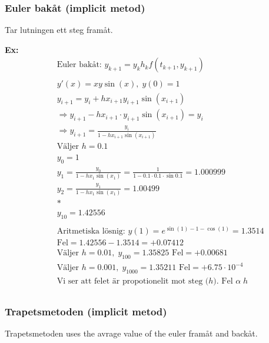 \newpage
\subsubsection{Euler bakåt (implicit metod)}
Tar lutningen ett steg framåt.

\textbf{Ex:}
\begin{align*}
  &\quad  \text{Euler bakåt: } y_{k+1} = y_k h_kf(t_{k+1},y_{k+1}) \\
  &\quad  \\
  &\quad  y'(x) = xy\sin{(x)}, \; y(0)=1 \\
  &\quad  y_{i+1} = y_i + hx_{i+1}y_{i+1}\sin{(x_{i+1})} \\
  &\quad  \Rightarrow y_{i+1} -hx_{i+1}\cdot{y_{i+1}}\sin{(x_{i+1})} = y_i \\
  &\quad  \Rightarrow y_{i+1} = \frac{y_i}{1 -hx_{i+1}\sin{(x_{i+1})}} \\
  &\quad  \text{Väljer $h=0.1$} \\
  &\quad  y_0 = 1 \\
  &\quad  y_1 = \frac{y_0}{1 -hx_{1}\sin{(x_{1})}} = \frac{1}{1 -0.1\cdot0.1\cdot\sin{0.1}}
        = 1.000999 \\
  &\quad  y_2 = \frac{y_1}{1 -hx_{1}\sin{(x_{1})}} = 1.00499 \\
  &\quad  * \\
  &\quad  y_{10} = 1.42556 \\
  &\quad  \\
  &\quad  \text{Aritmetiska lösnig: } y(1)=e^{\sin{(1)-1-\cos{(1)}}} = 1.3514 \\
  &\quad  \text{Fel} = 1.42556-1.3514 = +0.07412 \\
  &\quad  \text{Väljer } h=0.01, \; y_{100} = 1.35825 \text{ Fel} = +0.00681 \\
  &\quad  \text{Väljer } h=0.001, \; y_{1000} = 1.35211 \text{ Fel} = +6.75\cdot10^{-4} \\
  &\quad  \text{Vi ser att felet är propotionelit mot steg ($h$). Fel } \alpha \; h \\
\end{align*}

\newpage
\subsubsection{Trapetsmetoden (implicit metod)}
Trapetsmetoden uses the avrage value of the euler framåt and backåt.

